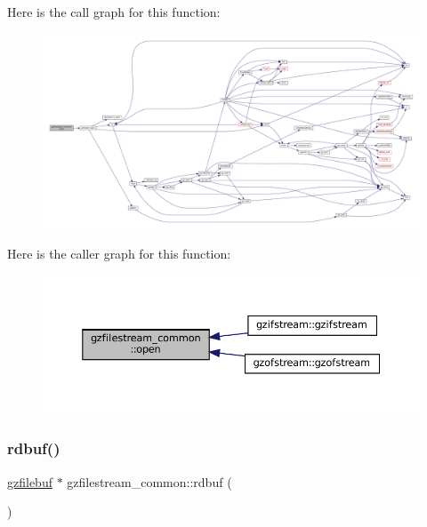 Here is the call graph for this function\+:
\nopagebreak
\begin{figure}[H]
\begin{center}
\leavevmode
\includegraphics[width=350pt]{classgzfilestream__common_a642732c6ddbdc437ea996acecf7d419b_cgraph}
\end{center}
\end{figure}
Here is the caller graph for this function\+:
\nopagebreak
\begin{figure}[H]
\begin{center}
\leavevmode
\includegraphics[width=350pt]{classgzfilestream__common_a642732c6ddbdc437ea996acecf7d419b_icgraph}
\end{center}
\end{figure}
\mbox{\label{classgzfilestream__common_a91b5d674d0d3980e80d0b36594f8f3b0}} 
\subsubsection{\texorpdfstring{rdbuf()}{rdbuf()}}
{\footnotesize\ttfamily \mbox{\hyperlink{classgzfilebuf}{gzfilebuf}} $\ast$ gzfilestream\+\_\+common\+::rdbuf (\begin{DoxyParamCaption}{ }\end{DoxyParamCaption})\hspace{0.3cm}{\ttfamily [private]}}



